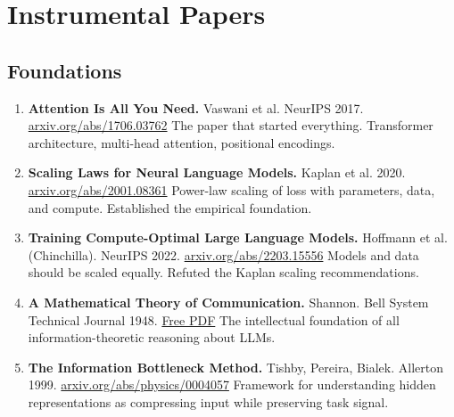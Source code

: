 \documentclass[11pt,a4paper]{article}
\begin{document}
\newpage

\section{Instrumental Papers}

\subsection*{Foundations}

\begin{enumerate}[leftmargin=2em,label=(\arabic*)]
	\item \textbf{Attention Is All You Need.} Vaswani et al. NeurIPS 2017.
	      \href{https://arxiv.org/abs/1706.03762}{arxiv.org/abs/1706.03762}
	      \newline The paper that started everything. Transformer architecture, multi-head attention, positional encodings.

	\item \textbf{Scaling Laws for Neural Language Models.} Kaplan et al. 2020.
	      \href{https://arxiv.org/abs/2001.08361}{arxiv.org/abs/2001.08361}
	      \newline Power-law scaling of loss with parameters, data, and compute. Established the empirical foundation.

	\item \textbf{Training Compute-Optimal Large Language Models.} Hoffmann et al. (Chinchilla). NeurIPS 2022.
	      \href{https://arxiv.org/abs/2203.15556}{arxiv.org/abs/2203.15556}
	      \newline Models and data should be scaled equally. Refuted the Kaplan scaling recommendations.

	\item \textbf{A Mathematical Theory of Communication.} Shannon. Bell System Technical Journal 1948.
	      \href{https://people.math.harvard.edu/~ctm/home/text/others/shannon/entropy/entropy.pdf}{Free PDF}
	      \newline The intellectual foundation of all information-theoretic reasoning about LLMs.

	\item \textbf{The Information Bottleneck Method.} Tishby, Pereira, Bialek. Allerton 1999.
	      \href{https://arxiv.org/abs/physics/0004057}{arxiv.org/abs/physics/0004057}
	      \newline Framework for understanding hidden representations as compressing input while preserving task signal.
\end{enumerate}
\end{document}
